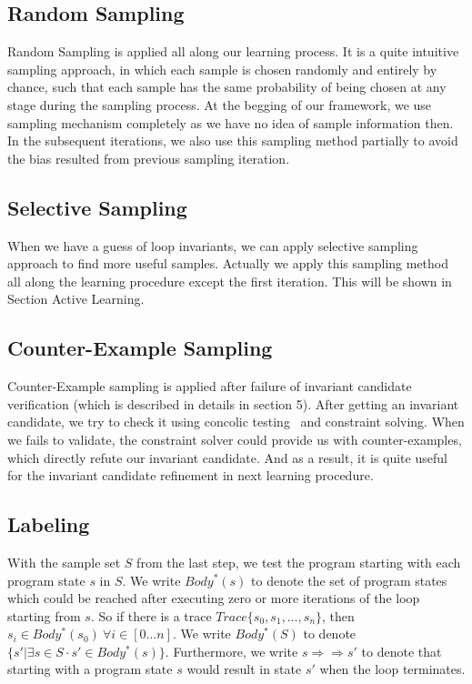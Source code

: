 \subsection{Random Sampling}
Random Sampling is applied all along our learning process.
It is a quite intuitive sampling approach, in which each sample is chosen randomly and entirely by chance, 
such that each sample has the same probability of being chosen at any stage during the sampling process.
At the begging of our framework, we use sampling mechanism completely as we have no idea of sample information then. 
In the subsequent iterations, we also use this sampling method partially to avoid the bias resulted from previous sampling iteration.


\subsection{Selective Sampling}
When we have a guess of loop invariants, we can apply selective sampling approach to find more useful samples.
Actually we apply this sampling method all along the learning procedure except the first iteration.
This will be shown in Section Active Learning.



\subsection{Counter-Example Sampling}
Counter-Example sampling is applied after failure of invariant candidate verification (which is described in details in section 5).
After getting an invariant candidate, we try to check it using concolic testing~\cite{} and constraint solving.
When we fails to validate, the constraint solver could provide us with counter-examples, 
which directly refute our invariant candidate.
And as a result, it is quite useful for the invariant candidate refinement in next learning procedure.



\subsection {Labeling}
With the sample set $S$ from the last step, we test the program starting with each program state $s$ in $S$. 
We write $Body^*(s)$ to denote the set of program states which could be reached after executing zero or more iterations of the loop starting from $s$.
So if there is a trace $Trace\{ s_0, s_1, \ldots, s_n\}$, then $s_i \in Body^*(s_0)\ \forall i \in [0 \ldots n]$.
We write $Body^*(S)$ to denote $\{s' | \exists s \in S \cdot s' \in Body^*(s)\}$. 
Furthermore, we write $s \Rightarrow\Rightarrow s'$ to denote that starting with a program state $s$ would result in state $s'$ when the loop terminates. 


